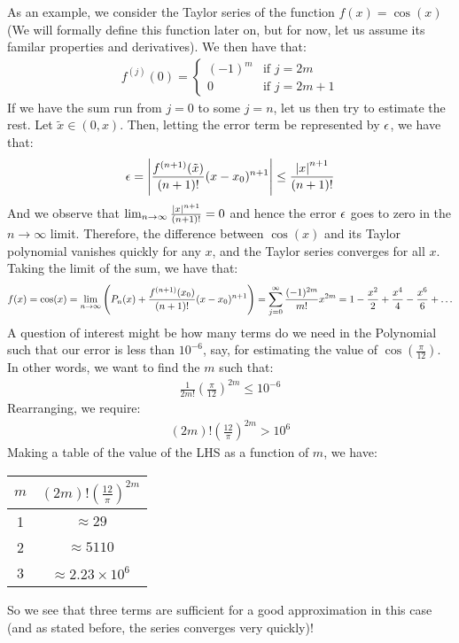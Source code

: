 \noindent As an example, we consider the Taylor series of the function $f(x) = \cos(x)$ (We will formally define this function later on, but for now, let us assume its familar properties and derivatives). We then have that:
\begin{align*}
    f^{(j)}(0) = \begin{cases}
        (-1)^m & \text{if $j = 2m$}
        \\ 0 & \text{if $j = 2m + 1$}
    \end{cases}
\end{align*}
If we have the sum run from $j = 0$ to some $j = n$, let us then try to estimate the rest. Let $\tilde{x} \in (0, x)$. Then, letting the error term be represented by $\epsilon$, we have that:
\begin{align*}
    \epsilon = \abs{\frac{f^{(n+1)}(\tilde{x})}{(n+1)!}(x-x_0)^{n+1}} \leq \frac{\abs{x}^{n+1}}{(n+1)!} 
\end{align*}
And we observe that $\lim_{n \rightarrow \infty} \frac{\abs{x}^{n+1}}{(n+1)!} = 0$ and hence the error $\epsilon$ goes to zero in the $n \rightarrow \infty$ limit. Therefore, the difference between $\cos(x)$ and its Taylor polynomial vanishes quickly for any $x$, and the Taylor series converges for all $x$. Taking the limit of the sum, we have that:
\begin{align*}
    f(x) = \cos(x) = \lim_{n \rightarrow \infty} \left(P_{n}(x) + \frac{f^{(n+1)}(x_0)}{(n+1)!}(x - x_0)^{n+1}\right) = \sum_{j=0}^\infty \frac{(-1)^{2m}}{m!}x^{2m} = 1 - \frac{x^2}{2} + \frac{x^4}{4} - \frac{x^6}{6} + \ldots
\end{align*}
A question of interest might be how many terms do we need in the Polynomial such that our error is less than $10^{-6}$, say, for estimating the value of $\cos(\frac{\pi}{12})$. In other words, we want to find the $m$ such that:
\begin{align*}
    \frac{1}{2m!}\left(\frac{\pi}{12}\right)^{2m} \leq 10^{-6}
\end{align*}
Rearranging, we require:
\begin{align*}
    (2m)!\left(\frac{12}{\pi}\right)^{2m} > 10^6
\end{align*}
Making a table of the value of the LHS as a function of $m$, we have:
\begin{table}[htbp]
    \centering\begin{tabular}{c|c}
    $m$ & $(2m)!\left(\frac{12}{\pi}\right)^{2m}$
    \\ \hline
    1 & $\approx 29$
    \\ 2 & $\approx 5110$
    \\ 3 & $\approx 2.23 \times 10^{6}$
    \end{tabular}
\end{table}
So we see that three terms are sufficient for a good approximation in this case (and as stated before, the series converges very quickly)!

